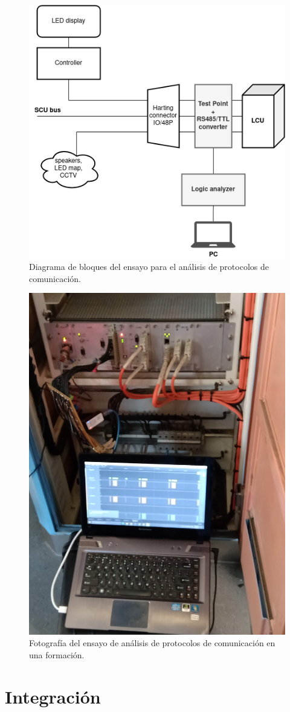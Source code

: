 \documentclass[
11pt, %
]{charter}
\begin{document}
\begin{figure}[htpb]
\centering 
\includegraphics[width=1\textwidth]{./Pics/sniffingDiagram.drawio.png}
\caption{Diagrama de bloques del ensayo para el análisis de protocolos de comunicación.}
\label{fig:sniffingDiagram}
\end{figure}

\begin{figure}[htpb]
\centering 
\includegraphics[width=1\textwidth]{./Pics/IMG_20210414_104653.jpg}
\caption{Fotografía del ensayo de análisis de protocolos de comunicación en una formación.}
\label{fig:sniffingPhoto}
\end{figure}

\section{Integración}
\end{document}
